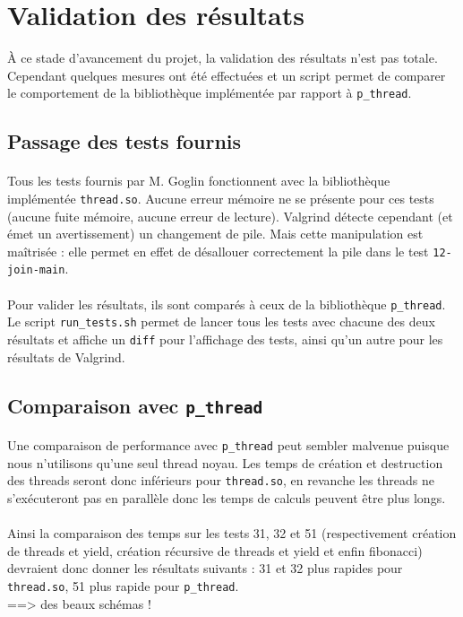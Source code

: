 \section{Validation des résultats}

\`A ce stade d'avancement du projet, la validation des résultats n'est pas totale. Cependant quelques mesures ont été effectuées et un script permet de comparer le comportement de la bibliothèque implémentée par rapport à \texttt{p\_thread}.

\subsection{Passage des tests fournis}

\paragraph{}
Tous les tests fournis par M. Goglin fonctionnent avec la bibliothèque implémentée \texttt{thread.so}. Aucune erreur mémoire ne se présente pour ces tests (aucune fuite mémoire, aucune erreur de lecture). \textsf{Valgrind} détecte cependant (et émet un avertissement) un changement de pile. Mais cette manipulation est maîtrisée : elle permet en effet de désallouer correctement la pile dans le test \texttt{12-join-main}.

\paragraph{}
Pour valider les résultats, ils sont comparés à ceux de la bibliothèque \texttt{p\_thread}. Le script \texttt{run\_tests.sh} permet de lancer tous les tests avec chacune des deux résultats et affiche un \texttt{diff} pour l'affichage des tests, ainsi qu'un autre pour les résultats de \textsf{Valgrind}.

\subsection{Comparaison avec \texttt{p\_thread}}

\paragraph{}
Une comparaison de performance avec \texttt{p\_thread} peut sembler malvenue puisque nous n'utilisons qu'une seul thread noyau. Les temps de création et destruction des threads seront donc inférieurs pour \texttt{thread.so}, en revanche les threads ne s'exécuteront pas en parallèle donc les temps de calculs peuvent être plus longs.

\paragraph{}
Ainsi la comparaison des temps sur les tests 31, 32 et 51 (respectivement création de threads et yield, création récursive de threads et yield et enfin fibonacci) devraient donc donner les résultats suivants : 31 et 32 plus rapides pour \texttt{thread.so}, 51 plus rapide pour \texttt{p\_thread}.
\\
==> des beaux schémas !
 
